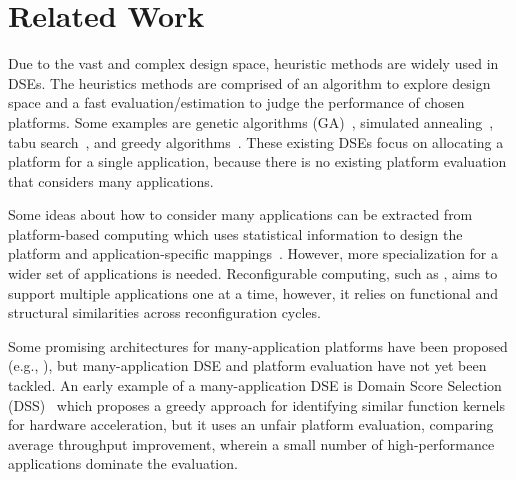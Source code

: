\vspace{-2pt}
\section{Related Work}
\label{sec:related}

Due to the vast and complex design space, heuristic methods are widely used in DSEs.
The heuristics methods are comprised of an algorithm to explore design space and a fast evaluation/estimation to judge the performance of chosen platforms.
Some examples are genetic algorithms (GA)~\cite{quan2014towards}, simulated annealing~\cite{liang2013hardware}, tabu search~\cite{wu2013efficient}, and greedy algorithms~\cite{tang2015hardware}.
These existing DSEs focus on allocating a platform for a single application, because there is no existing platform evaluation that considers many applications. 

Some ideas about how to consider many applications can be extracted from platform-based computing which uses statistical information to design the platform and application-specific mappings~\cite{graf2014multi, gladigau2010system}. However, more specialization for a wider set of applications is needed. Reconfigurable computing, such as \cite{wildermann2011operational}, aims to support multiple applications one at a time, however, it relies on functional and structural similarities across reconfiguration cycles.

Some promising architectures for many-application platforms have been proposed (e.g., \cite{tabkhi2014function, nowatzki2017domain}), but many-application DSE and platform evaluation have not yet been tackled. 
An early example of a many-application DSE is Domain Score Selection (DSS)~\cite{zhang2018ds} which proposes a greedy approach for identifying similar function kernels for hardware acceleration, but it uses an unfair platform evaluation, comparing average throughput improvement, wherein a small number of high-performance applications dominate the evaluation. 